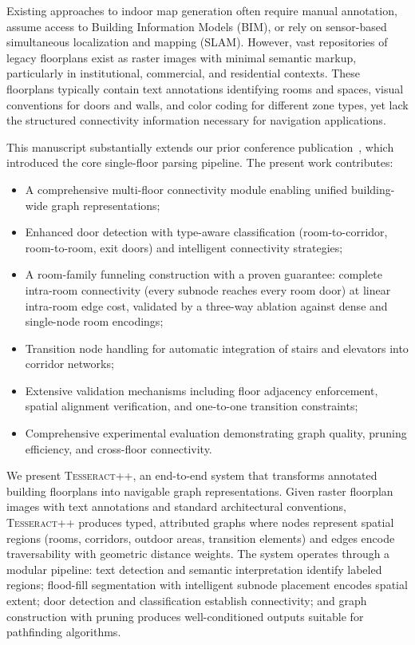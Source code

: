 \documentclass[manuscript,screen,review]{acmart}
\newcommand{\tesseract}{\textsc{Tesseract++}}
\begin{document}
Existing approaches to indoor map generation often require manual annotation, assume access to Building Information Models (BIM), or rely on sensor-based simultaneous localization and mapping (SLAM). However, vast repositories of legacy floorplans exist as raster images with minimal semantic markup, particularly in institutional, commercial, and residential contexts. These floorplans typically contain text annotations identifying rooms and spaces, visual conventions for doors and walls, and color coding for different zone types, yet lack the structured connectivity information necessary for navigation applications.

This manuscript substantially extends our prior conference publication~\cite{tesseract_conference}, which introduced the core single-floor parsing pipeline. The present work contributes:
\begin{itemize}
    \item A comprehensive multi-floor connectivity module enabling unified building-wide graph representations;
    \item Enhanced door detection with type-aware classification (room-to-corridor, room-to-room, exit doors) and intelligent connectivity strategies;
    \item A room-family funneling construction with a proven guarantee: complete intra-room connectivity (every subnode reaches every room door) at linear intra-room edge cost, validated by a three-way ablation against dense and single-node room encodings;
    \item Transition node handling for automatic integration of stairs and elevators into corridor networks;
    \item Extensive validation mechanisms including floor adjacency enforcement, spatial alignment verification, and one-to-one transition constraints;
    \item Comprehensive experimental evaluation demonstrating graph quality, pruning efficiency, and cross-floor connectivity.
\end{itemize}

We present \tesseract{}, an end-to-end system that transforms annotated building floorplans into navigable graph representations. Given raster floorplan images with text annotations and standard architectural conventions, \tesseract{} produces typed, attributed graphs where nodes represent spatial regions (rooms, corridors, outdoor areas, transition elements) and edges encode traversability with geometric distance weights. The system operates through a modular pipeline: text detection and semantic interpretation identify labeled regions; flood-fill segmentation with intelligent subnode placement encodes spatial extent; door detection and classification establish connectivity; and graph construction with pruning produces well-conditioned outputs suitable for pathfinding algorithms.
\end{document}
